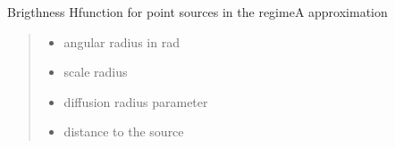 \documentclass[letterpaper,10pt,english]{sphinxmanual}
\begin{document}
\begin{fulllineitems}
\label{\detokenize{diffsph.profiles:diffsph.profiles.analytics.psbrA}}
\pysigstartsignatures
{}
\pysigstopsignatures
\sphinxAtStartPar
Brigthness H\sphinxhyphen{}function for point sources in the regime\sphinxhyphen{}A approximation
\begin{quote}\begin{description}
\begin{itemize}
\item {} 
\sphinxAtStartPar
{} \textendash{} angular radius in rad

\item {} 
\sphinxAtStartPar
{} \textendash{} scale radius

\item {} 
\sphinxAtStartPar
{} \textendash{} diffusion radius parameter

\item {} 
\sphinxAtStartPar
{} \textendash{} distance to the source

\end{itemize}

\end{description}\end{quote}

\end{fulllineitems}

\end{document}
